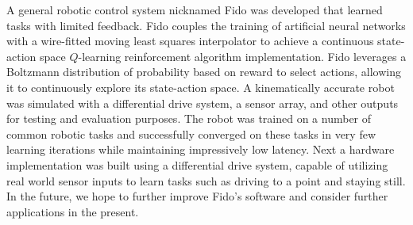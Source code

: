 A general robotic control system nicknamed Fido was developed that learned tasks with limited feedback.
Fido couples the training of artificial neural networks with a wire-fitted moving least squares interpolator to achieve a continuous state-action space $Q$-learning reinforcement algorithm implementation.
Fido leverages a Boltzmann distribution of probability based on reward to select actions, allowing it to continuously explore its state-action space.
A kinematically accurate robot was simulated with a differential drive system, a sensor array, and other outputs for testing and evaluation purposes.
The robot was trained on a number of common robotic tasks and successfully converged on these tasks in very few learning iterations while maintaining impressively low latency.
Next a hardware implementation was built using a differential drive system, capable of utilizing real world sensor inputs to learn tasks such as driving to a point and staying still.
In the future, we hope to further improve Fido's software and consider further applications in the present.
